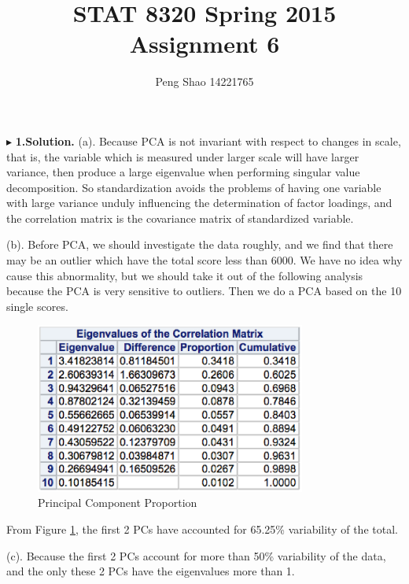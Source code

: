 \documentclass[letterpaper, 12pt]{article}
\begin{document}
\title{STAT 8320 Spring 2015 Assignment 6}
\author{Peng Shao 14221765}
\maketitle
\indent




$\blacktriangleright$ \textbf{1.\quad Solution.} 
(a). Because PCA is not invariant with respect to changes in scale, that is, the variable which is measured under larger scale will have larger variance, then produce a large eigenvalue when performing singular value decomposition. So standardization avoids the problems of having one variable with large variance unduly influencing the determination of factor loadings, and the correlation matrix is the covariance matrix of standardized variable.

(b). Before PCA, we should investigate the data roughly, and we find that there may be an outlier which have the total score less than 6000. We have no idea why cause this abnormality, but we should take it out of the following analysis because the PCA is very sensitive to outliers. Then we do a PCA based on the 10 single scores.

\begin{figure}[htbp]
\centering\includegraphics[width=3.5in]{7-1.eps}
\caption{Principal Component Proportion}\label{1}
\end{figure}

From Figure \ref{1}, the first 2 PCs have accounted for 65.25\% variability of the total.


(c).
Because the first 2 PCs account for more than 50\% variability of the data, and the only these 2 PCs have the eigenvalues more than 1.
\end{document}
